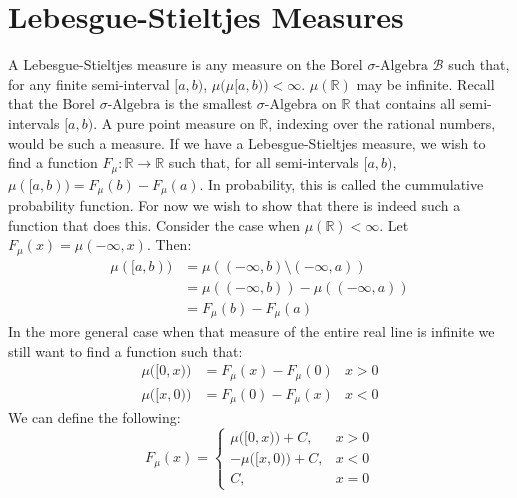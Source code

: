         \section{Lebesgue-Stieltjes Measures}
            A Lebesgue-Stieltjes measure is any measure on the
            Borel $\sigma\text{-Algebra}$ $\mathcal{B}$ such that,
            for any finite semi-interval $[a,b)$,
            $\mu\big(\mu[a,b)\big)<\infty$. $\mu(\mathbb{R})$ may
            be infinite. Recall that the Borel $\sigma\text{-Algebra}$
            is the smallest $\sigma\text{-Algebra}$ on $\mathbb{R}$
            that contains all semi-intervals $[a,b)$. A pure point
            measure on $\mathbb{R}$, indexing over the rational
            numbers, would be such a measure. If we have a
            Lebesgue-Stieltjes measure, we wish to find a function
            $F_{\mu}:\mathbb{R}\rightarrow\mathbb{R}$ such that, for
            all semi-intervals $[a,b)$,
            $\mu([a,b))=F_{\mu}(b)-F_{\mu}(a)$. In probability, this
            is called the cummulative probability function. For now
            we wish to show that there is indeed such a function that
            does this. Consider the case when $\mu(\mathbb{R})<\infty$.
            Let $F_{\mu}(x)=\mu(-\infty,x)$. Then:
            \begin{align}
                \mu([a,b))
                &=\mu((-\infty,b)\setminus(-\infty,a))\\
                &=\mu((-\infty,b))-\mu((-\infty,a))\\
                &=F_{\mu}(b)-F_{\mu}(a)
            \end{align}
            In the more general case when that measure of the entire
            real line is infinite we still want to find a function
            such that:
            \begin{align}
                \mu\big([0,x)\big)&=F_{\mu}(x)-F_{\mu}(0)&x>0\\
                \mu\big([x,0)\big)&=F_{\mu}(0)-F_{\mu}(x)&x<0
            \end{align}
            We can define the following:
            \begin{equation}
                F_{\mu}(x)=
                \begin{cases}
                    \mu\big([0,x)\big)+C,&x>0\\
                    -\mu\big([x,0)\big)+C,&x<0\\
                    C,&x=0
                \end{cases}
            \end{equation}
